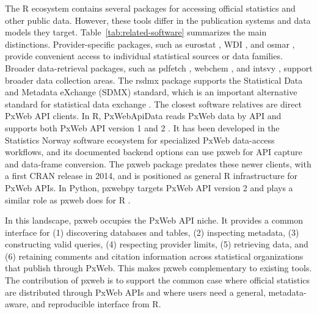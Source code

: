 \documentclass[11pt]{article}
\DeclareRobustCommand{\pkg}[1]{\textsf{#1}}
\DeclareRobustCommand{\proglang}[1]{\textsf{#1}}
\begin{document}
The \proglang{R} ecosystem contains several packages for accessing official statistics and other public data.
However, these tools differ in the publication systems and data models they target.
Table~\ref{tab:related-software} summarizes the main distinctions.
Provider-specific packages, such as \pkg{eurostat} \citep{Lahti17eurostat}, \pkg{WDI} \citep{WDI}, and \pkg{osmar} \citep{osmar}, provide convenient access to individual statistical sources or data families.
Broader data-retrieval packages, such as \pkg{pdfetch} \citep{pdfetch}, \pkg{webchem} \citep{szocs2020webchem}, and \pkg{intsvy} \citep{caro2017intsvy}, support broader data collection areas.
The \pkg{rsdmx} package supports the Statistical Data and Metadata eXchange (SDMX) standard, which is an important alternative standard for statistical data exchange \citep{rsdmx,willekens2023sdmx}.
The closest software relatives are direct PxWeb API clients.
In \proglang{R}, \pkg{PxWebApiData} reads PxWeb data by API and supports both PxWeb API version 1 and 2 \citep{PxWebApiData}.
It has been developed in the Statistics Norway software ecosystem for specialized PxWeb data-access workflows, and its documented backend options can use \pkg{pxweb} for API capture and data-frame conversion.
The \pkg{pxweb} package predates these newer clients, with a first CRAN release in 2014, and is positioned as general \proglang{R} infrastructure for PxWeb APIs.
In \proglang{Python}, \pkg{pxwebpy} targets PxWeb API version 2 and plays a similar role as \pkg{pxweb} does for \proglang{R} \citep{pxwebpy}.

In this landscape, \pkg{pxweb} occupies the PxWeb API niche.
It provides a common interface for (1) discovering databases and tables, (2) inspecting metadata, (3) constructing valid queries, (4) respecting provider limits, (5) retrieving data, and (6) retaining comments and citation information across statistical organizations that publish through PxWeb.
This makes \pkg{pxweb} complementary to existing tools.
The contribution of \pkg{pxweb} is to support the common case where official statistics are distributed through PxWeb APIs and where users need a general, metadata-aware, and reproducible interface from \proglang{R}.
\end{document}
